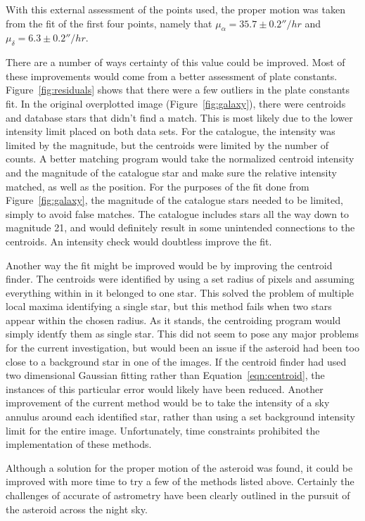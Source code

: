 \documentclass[a4paper,12pt]{article}
\begin{document}
With this external assessment of the points used, the proper motion was taken from the fit of the first four points, namely that $\mu_{\alpha} = 35.7\pm 0.2 ''/hr$ and $\mu_{\delta} = 6.3\pm 0.2 ''/hr$.

There are a number of ways certainty of this value could be improved. Most of these improvements would come from a better assessment of plate constants. Figure~\ref{fig:residuals} shows that there were a few outliers in the plate constants fit. In the original overplotted image (Figure~\ref{fig:galaxy}), there were centroids and database stars that didn't find a match. This is most likely due to the lower intensity limit placed on both data sets. For the catalogue, the intensity was limited by the magnitude, but the centroids were limited by the number of counts. A better matching program would take the normalized centroid intensity and the magnitude of the catalogue star and make sure the relative intensity matched, as well as the position. For the purposes of the fit done from Figure~\ref{fig:galaxy}, the magnitude of the catalogue stars needed to be limited, simply to avoid false matches. The catalogue includes stars all the way down to magnitude 21, and would definitely result in some unintended connections to the centroids. An intensity check would doubtless improve the fit.

Another way the fit might be improved would be by improving the centroid finder. The centroids were identified by using a set radius of pixels and assuming everything within in it belonged to one star. This solved the problem of multiple local maxima identifying a single star, but this method fails when two stars appear within the chosen radius. As it stands, the centroiding program would simply identfy them as single star. This did not seem to pose any major problems for the current investigation, but would been an issue if the asteroid had been too close to a background star in one of the images. If the centroid finder had used two dimensional Gaussian fitting rather than Equation~\ref{eqn:centroid}, the instances of this particular error would likely have been reduced. Another improvement of the current method would be to take the intensity of a sky annulus around each identified star, rather than using a set background intensity limit for the entire image. Unfortunately, time constraints prohibited the implementation of these methods.

Although a solution for the proper motion of the asteroid was found, it could be improved with more time to try a few of the methods listed above. Certainly the challenges of accurate of astrometry have been clearly outlined in the pursuit of the asteroid across the night sky.



\end{document}
